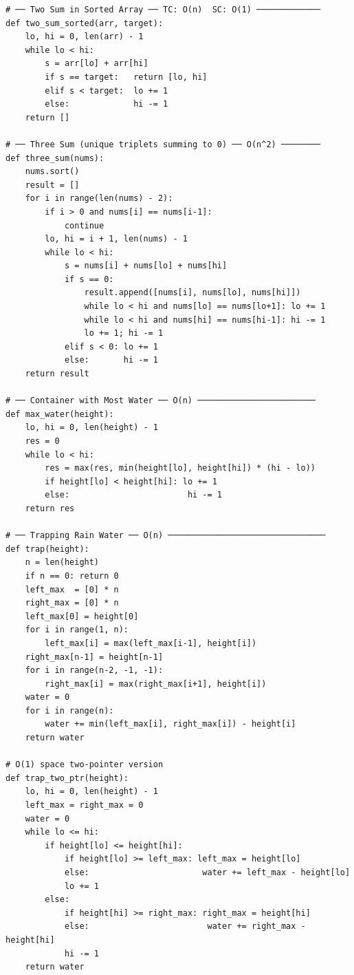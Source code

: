 \documentclass[11pt,a4paper]{report}
\begin{document}
\begin{lstlisting}
# ── Two Sum in Sorted Array ── TC: O(n)  SC: O(1) ─────────────
def two_sum_sorted(arr, target):
    lo, hi = 0, len(arr) - 1
    while lo < hi:
        s = arr[lo] + arr[hi]
        if s == target:   return [lo, hi]
        elif s < target:  lo += 1
        else:             hi -= 1
    return []

# ── Three Sum (unique triplets summing to 0) ── O(n^2) ────────
def three_sum(nums):
    nums.sort()
    result = []
    for i in range(len(nums) - 2):
        if i > 0 and nums[i] == nums[i-1]:
            continue
        lo, hi = i + 1, len(nums) - 1
        while lo < hi:
            s = nums[i] + nums[lo] + nums[hi]
            if s == 0:
                result.append([nums[i], nums[lo], nums[hi]])
                while lo < hi and nums[lo] == nums[lo+1]: lo += 1
                while lo < hi and nums[hi] == nums[hi-1]: hi -= 1
                lo += 1; hi -= 1
            elif s < 0: lo += 1
            else:       hi -= 1
    return result

# ── Container with Most Water ── O(n) ────────────────────────
def max_water(height):
    lo, hi = 0, len(height) - 1
    res = 0
    while lo < hi:
        res = max(res, min(height[lo], height[hi]) * (hi - lo))
        if height[lo] < height[hi]: lo += 1
        else:                        hi -= 1
    return res

# ── Trapping Rain Water ── O(n) ────────────────────────────────
def trap(height):
    n = len(height)
    if n == 0: return 0
    left_max  = [0] * n
    right_max = [0] * n
    left_max[0] = height[0]
    for i in range(1, n):
        left_max[i] = max(left_max[i-1], height[i])
    right_max[n-1] = height[n-1]
    for i in range(n-2, -1, -1):
        right_max[i] = max(right_max[i+1], height[i])
    water = 0
    for i in range(n):
        water += min(left_max[i], right_max[i]) - height[i]
    return water

# O(1) space two-pointer version
def trap_two_ptr(height):
    lo, hi = 0, len(height) - 1
    left_max = right_max = 0
    water = 0
    while lo <= hi:
        if height[lo] <= height[hi]:
            if height[lo] >= left_max: left_max = height[lo]
            else:                       water += left_max - height[lo]
            lo += 1
        else:
            if height[hi] >= right_max: right_max = height[hi]
            else:                        water += right_max - height[hi]
            hi -= 1
    return water
\end{lstlisting}
\end{document}
